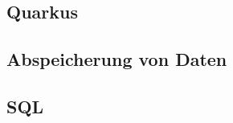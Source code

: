 \begin{spacing}{1}
    \section{Quarkus}\label{section:quarkus}
    \end{spacing}


\begin{spacing}{1}
    \section{Abspeicherung von Daten}\label{section:savedata}
    \end{spacing}


\begin{spacing}{1}
    \section{SQL}\label{section:sql}
    \end{spacing}


